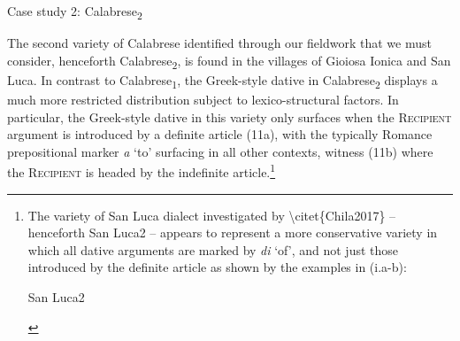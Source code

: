 \documentclass[output=paper,modfonts,nonflat]{langsci/langscibook}
\begin{document}
\setcounter{listWWNumxileveli}{0}
\begin{listWWNumxileveli}
\item 

\setcounter{listWWNumxilevelii}{0}
\begin{listWWNumxilevelii}
\item 
\begin{stylelsSectionii}
Case study 2: Calabrese\textsubscript{2}
\end{stylelsSectionii}
\end{listWWNumxilevelii}
\end{listWWNumxileveli}
\begin{styleStandard}
The second variety of Calabrese identified through our fieldwork that we must consider, henceforth Calabrese\textsubscript{2}, is found in the villages of Gioiosa Ionica and San Luca. In contrast to Calabrese\textsubscript{1}, the Greek-style dative in Calabrese\textsubscript{2} displays a much more restricted distribution subject to lexico-structural factors. In particular, the Greek-style dative in this variety only surfaces when the \textsc{Recipient} argument is introduced by a definite article (11a), with the typically Romance prepositional marker \textit{a }‘to’ surfacing in all other contexts, witness (11b) where the \textsc{Recipient} is headed by the indefinite article.\footnote{ The variety of San Luca dialect investigated by {\textbackslash}citet\{Chila2017\} – henceforth San Luca2 – appears to represent a more conservative variety in which all dative arguments are marked by \textit{di }‘of’, and not just those introduced by the definite article as shown by the examples in (i.a-b):\par \par 
\setcounter{listWWNumxleveli}{0}
\begin{listWWNumxleveli}
\item 
\begin{styleFootnote}
San Luca2
\end{styleFootnote}



\end{listWWNumxleveli}}
\end{styleStandard}
\end{document}
